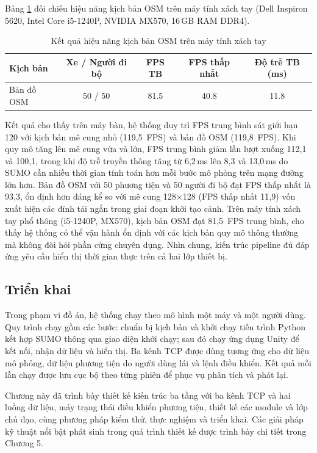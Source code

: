 \documentclass[../DoAn.tex]{subfiles}
\begin{document}
Bảng \ref{tab:perf-laptop} đối chiếu hiệu năng kịch bản OSM trên máy tính xách tay
(Dell Inspiron 5620, Intel Core i5-1240P, NVIDIA MX570, 16\,GB RAM DDR4).

\begin{table}[htbp]
	\centering
	\caption{Kết quả hiệu năng kịch bản OSM trên máy tính xách tay}
	\label{tab:perf-laptop}
	\small
	\begin{tabular}{|p{}|c|c|c|c|}
		\hline
		\textbf{Kịch bản} & \textbf{Xe / Người đi bộ} & \textbf{FPS TB} & \textbf{FPS thấp nhất} & \textbf{Độ trễ TB (ms)} \\
		\hline
		Bản đồ OSM & 50 / 50 & 81.5 & 40.8 & 11.8 \\
		\hline
	\end{tabular}
\end{table}

Kết quả cho thấy trên máy bàn, hệ thống duy trì FPS trung bình sát giới hạn 120
với kịch bản mê cung nhỏ (119{,}5~FPS) và bản đồ OSM (119{,}8~FPS). Khi quy mô
tăng lên mê cung vừa và lớn, FPS trung bình giảm lần lượt xuống 112{,}1 và
100{,}1, trong khi độ trễ truyền thông tăng từ 6{,}2\,ms lên 8{,}3 và 13{,}0\,ms
do SUMO cần nhiều thời gian tính toán hơn mỗi bước mô phỏng trên mạng đường lớn hơn. Bản đồ OSM với 50 phương tiện và 50 người
đi bộ đạt FPS thấp nhất là 93{,}3, ổn định hơn đáng kể so với mê cung 128$\times$128
(FPS thấp nhất 11{,}9) vốn xuất hiện các đỉnh tải ngắn trong giai đoạn khởi tạo
cảnh. Trên máy tính xách tay phổ thông (i5-1240P, MX570), kịch bản OSM đạt 81{,}5~FPS
trung bình, cho thấy hệ thống có thể vận hành ổn định với các kịch bản quy mô
thông thường mà không đòi hỏi phần cứng chuyên dụng. Nhìn chung, kiến trúc
pipeline đủ đáp ứng yêu cầu hiển thị thời gian thực trên cả hai lớp thiết bị.

\subsection{Triển khai}

Trong phạm vi đồ án, hệ thống chạy theo mô hình một máy và một người dùng. Quy
trình chạy gồm các bước: chuẩn bị kịch bản và khởi chạy tiến trình Python kết hợp
\gls{SUMO} thông qua giao diện khởi chạy; sau đó chạy ứng dụng Unity để kết nối,
nhận dữ liệu và hiển thị. Ba kênh TCP được dùng tương ứng cho dữ liệu mô phỏng, dữ liệu
phương tiện do người dùng lái và lệnh điều khiển. Kết quả mỗi lần chạy được lưu
cục bộ theo từng phiên để phục vụ phân tích và phát lại.

Chương này đã trình bày thiết kế kiến trúc ba tầng với ba kênh TCP và hai luồng
dữ liệu, máy trạng thái điều khiển phương tiện, thiết kế các module và lớp chủ
đạo, cùng phương pháp kiểm thử, thực nghiệm và triển khai. Các giải pháp kỹ thuật
nổi bật phát sinh trong quá trình thiết kế được trình bày chi tiết trong Chương 5.
\end{document}
